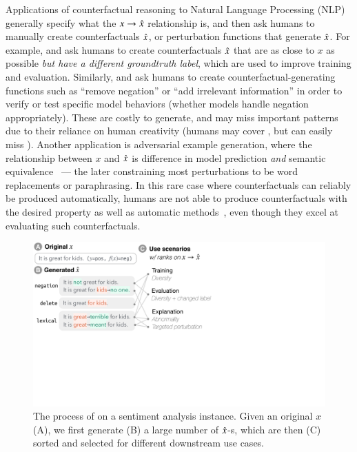 Applications of counterfactual reasoning to Natural Language Processing (NLP) generally specify what the $x \rightarrow \hat{x}$ relationship is, and then ask humans to manually create counterfactuals $\hat{x}$, or perturbation functions that generate $\hat{x}$.
For example, \citet{gardner2020contrast} and \citet{kaushik2019learning} ask humans to create counterfactuals $\hat{x}$ that are as close to $x$ as possible \emph{but have a different groundtruth label}, which are used to improve training and evaluation. 
Similarly, \citet{wu2019errudite} and \citet{checklist:acl20} ask humans to create counterfactual-generating functions such as ``remove negation'' or ``add irrelevant information'' in order to verify or test specific model behaviors (\eg whether models handle negation appropriately).
These are costly to generate, and may miss important patterns due to their reliance on human creativity (\eg humans may cover , but can easily miss ).
Another application is adversarial example generation, where the relationship between $x$ and $\hat{x}$ is difference in model prediction \emph{and} semantic equivalence~\cite{iyyer2018adversarial, ribeiro2018semantically} --- the later constraining most perturbations to be word replacements or paraphrasing.
In this rare case where counterfactuals can reliably be produced automatically, humans are not able to produce counterfactuals with the desired property as well as automatic methods~\cite{ribeiro2018semantically}, even though they excel at evaluating such counterfactuals.

\begin{figure}[t]
\centering
\includegraphics[trim={0 17cm 26cm 0cm},clip, width=1\columnwidth]{figures/teaser}
\vspace{-15pt}
\caption{
The process of \sysname on a sentiment analysis instance.
Given an original $x$ (A), we first generate (B) a large number of $\hat{x}$-s, which are then (C) sorted and selected for different downstream use cases.}
\vspace{-15pt}
\label{fig:teaser}
\end{figure} 
 

